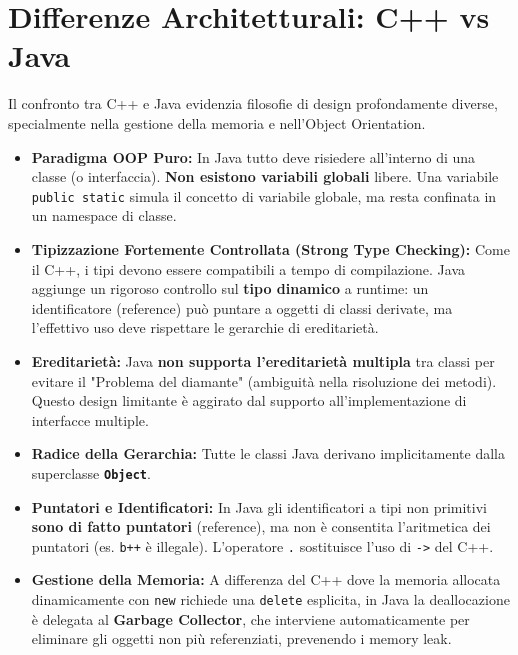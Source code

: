 \documentclass[12pt,a4paper,oneside]{book}
\begin{document}
\section{Differenze Architetturali: C++ vs Java}
Il confronto tra C++ e Java evidenzia filosofie di design profondamente diverse, specialmente nella gestione della memoria e nell'Object Orientation.
\begin{itemize}
    \item \textbf{Paradigma OOP Puro:} In Java tutto deve risiedere all'interno di una classe (o interfaccia). \textbf{Non esistono variabili globali} libere. Una variabile \texttt{public static} simula il concetto di variabile globale, ma resta confinata in un namespace di classe.
    \item \textbf{Tipizzazione Fortemente Controllata (Strong Type Checking):} Come il C++, i tipi devono essere compatibili a tempo di compilazione. Java aggiunge un rigoroso controllo sul \textbf{tipo dinamico} a runtime: un identificatore (reference) può puntare a oggetti di classi derivate, ma l'effettivo uso deve rispettare le gerarchie di ereditarietà.
    \item \textbf{Ereditarietà:} Java \textbf{non supporta l'ereditarietà multipla} tra classi per evitare il "Problema del diamante" (ambiguità nella risoluzione dei metodi). Questo design limitante è aggirato dal supporto all'implementazione di interfacce multiple.
    \item \textbf{Radice della Gerarchia:} Tutte le classi Java derivano implicitamente dalla superclasse \textbf{\texttt{Object}}.
    \item \textbf{Puntatori e Identificatori:} In Java gli identificatori a tipi non primitivi \textbf{sono di fatto puntatori} (reference), ma non è consentita l'aritmetica dei puntatori (es. \texttt{b++} è illegale). L'operatore \texttt{.} sostituisce l'uso di \texttt{->} del C++.
    \item \textbf{Gestione della Memoria:} A differenza del C++ dove la memoria allocata dinamicamente con \texttt{new} richiede una \texttt{delete} esplicita, in Java la deallocazione è delegata al \textbf{Garbage Collector}, che interviene automaticamente per eliminare gli oggetti non più referenziati, prevenendo i memory leak.
\end{itemize}
\end{document}
